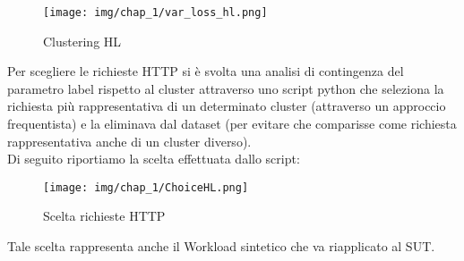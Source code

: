 \begin{figure}[H]
    \centering
    \texttt{[image: img/chap\_1/var\_loss\_hl.png]}
    \caption{Clustering HL}
    \label{fig:clust_hl}
\end{figure}
\noindent
Per scegliere le richieste HTTP si è svolta una analisi di contingenza del parametro label rispetto al cluster attraverso uno script python che seleziona la richiesta più rappresentativa di un determinato cluster (attraverso un approccio frequentista) e la eliminava dal dataset (per evitare che comparisse come richiesta rappresentativa anche di un cluster diverso).\\
Di seguito riportiamo la scelta effettuata dallo script:
\begin{figure}[H]
    \centering
    \texttt{[image: img/chap\_1/ChoiceHL.png]}
    \caption{Scelta richieste HTTP}
    \label{fig:ch_http_req}
\end{figure}
\noindent
Tale scelta rappresenta anche il Workload sintetico che va riapplicato al SUT.
